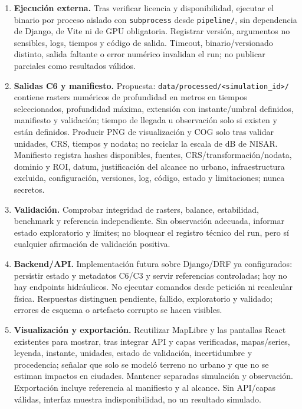 \documentclass[11pt,a4paper]{article}
\begin{document}
\begin{enumerate}
\item \textbf{Ejecución externa.} Tras verificar licencia y disponibilidad, ejecutar el binario por proceso aislado con \texttt{subprocess} desde \texttt{pipeline/}, sin dependencia de Django, de Vite ni de GPU obligatoria. Registrar versión, argumentos no sensibles, logs, tiempos y código de salida. Timeout, binario/versionado distinto, salida faltante o error numérico invalidan el run; no publicar parciales como resultados válidos.
\item \textbf{Salidas C6 y manifiesto.} Propuesta: \texttt{data/processed/<simulation\_id>/} contiene rasters numéricos de profundidad en metros en tiempos seleccionados, profundidad máxima, extensión con instante/umbral definidos, manifiesto y validación; tiempo de llegada u observación solo si existen y están definidos. Producir PNG de visualización y COG solo tras validar unidades, CRS, tiempos y nodata; no reciclar la escala de dB de NISAR. Manifiesto registra hashes disponibles, fuentes, CRS/transformación/nodata, dominio y ROI, datum, justificación del alcance no urbano, infraestructura excluida, configuración, versiones, log, código, estado y limitaciones; nunca secretos.
\item \textbf{Validación.} Comprobar integridad de rasters, balance, estabilidad, benchmark y referencia independiente. Sin observación adecuada, informar estado exploratorio y límites; no bloquear el registro técnico del run, pero sí cualquier afirmación de validación positiva.
\item \textbf{Backend/API.} Implementación futura sobre Django/DRF ya configurados: persistir estado y metadatos C6/C3 y servir referencias controladas; hoy no hay endpoints hidráulicos. No ejecutar comandos desde petición ni recalcular física. Respuestas distinguen pendiente, fallido, exploratorio y validado; errores de esquema o artefacto corrupto se hacen visibles.
\item \textbf{Visualización y exportación.} Reutilizar MapLibre y las pantallas React existentes para mostrar, tras integrar API y capas verificadas, mapas/series, leyenda, instante, unidades, estado de validación, incertidumbre y procedencia; señalar que solo se modeló terreno no urbano y que no se estiman impactos en ciudades. Mantener separadas simulación y observación. Exportación incluye referencia al manifiesto y al alcance. Sin API/capas válidas, interfaz muestra indisponibilidad, no un resultado simulado.
\end{enumerate}
\end{document}
